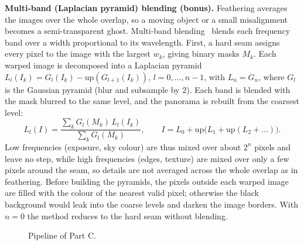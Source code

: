 \documentclass[a4paper,12pt]{article}
\begin{document}
\textbf{Multi-band (Laplacian pyramid) blending (bonus).} Feathering averages the images over the whole overlap, so a moving object or a small misalignment becomes a semi-transparent ghost. Multi-band blending~\cite{burt1983} blends each frequency band over a width proportional to its wavelength. First, a hard seam assigns every pixel to the image with the largest $w_k$, giving binary masks $M_k$. Each warped image is decomposed into a Laplacian pyramid $L_l(I_k)=G_l(I_k)-\mathrm{up}(G_{l+1}(I_k))$, $l=0,\dots,n-1$, with $L_n=G_n$, where $G_l$ is the Gaussian pyramid (blur and subsample by 2). Each band is blended with the mask blurred to the same level, and the panorama is rebuilt from the coarsest level:
\begin{equation}
L_l(I)=\frac{\sum_k G_l(M_k)\,L_l(I_k)}{\sum_k G_l(M_k)},\qquad I=L_0+\mathrm{up}\big(L_1+\mathrm{up}(L_2+\dots)\big).
\end{equation}
Low frequencies (exposure, sky colour) are thus mixed over about $2^n$ pixels and leave no step, while high frequencies (edges, texture) are mixed over only a few pixels around the seam, so details are not averaged across the whole overlap as in feathering. Before building the pyramids, the pixels outside each warped image are filled with the colour of the nearest valid pixel; otherwise the black background would leak into the coarse levels and darken the image borders. With $n=0$ the method reduces to the hard seam without blending.

\begin{figure}[H]
\centering
{}
\caption{Pipeline of Part C.}
\end{figure}
\end{document}
